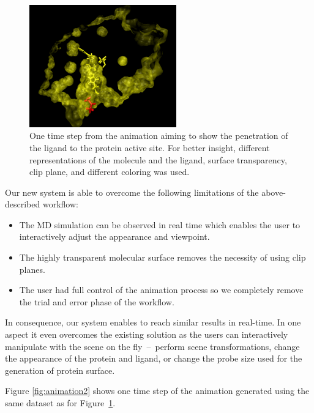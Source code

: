 \begin{figure}[htb]
  \centering
  \includegraphics[width=2.5in]{image/animation.png}
  \caption{One time step from the animation aiming to show the penetration of the ligand to the protein active site. For better insight, different representations of the molecule and the ligand, surface transparency, clip plane, and different coloring was used.}
	\label{fig:animation}
\end{figure}

Our new system is able to overcome the following limitations of the above-described workflow:
\begin{itemize} 
\item The MD simulation can be observed in real time which enables the user to interactively adjust the appearance and viewpoint.
\item The highly transparent molecular surface removes the necessity of using clip planes.
\item The user had full control of the animation process so we completely remove the trial and error phase of the workflow. 
\end{itemize}

In consequence, our system enables to reach similar results in real-time. 
In one aspect it even overcomes the existing solution as the users can interactively manipulate with the scene on the fly~--~perform scene transformations, change the appearance of the protein and ligand, or change the probe size used for the generation of protein surface.

Figure \ref{fig:animation2} shows one time step of the animation generated using the same dataset as for Figure~\ref{fig:animation}.

